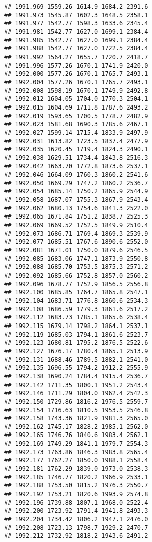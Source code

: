\documentclass[
]{article}
\begin{document}
\begin{verbatim}
## 1991.969 1559.26 1614.9 1684.2 2391.6
## 1991.973 1545.87 1602.3 1648.5 2358.1
## 1991.977 1542.77 1598.3 1633.6 2345.4
## 1991.981 1542.77 1627.0 1699.1 2384.4
## 1991.985 1542.77 1627.0 1699.1 2384.4
## 1991.988 1542.77 1627.0 1722.5 2384.4
## 1991.992 1564.27 1655.7 1720.7 2418.7
## 1991.996 1577.26 1670.1 1741.9 2420.0
## 1992.000 1577.26 1670.1 1765.7 2493.1
## 1992.004 1577.26 1670.1 1765.7 2493.1
## 1992.008 1598.19 1670.1 1749.9 2492.8
## 1992.012 1604.05 1704.0 1770.3 2504.1
## 1992.015 1604.69 1711.8 1787.6 2493.2
## 1992.019 1593.65 1700.5 1778.7 2482.9
## 1992.023 1581.68 1690.3 1785.6 2467.1
## 1992.027 1599.14 1715.4 1833.9 2497.9
## 1992.031 1613.82 1723.5 1837.4 2477.9
## 1992.035 1620.45 1719.4 1824.3 2490.1
## 1992.038 1629.51 1734.4 1843.8 2516.3
## 1992.042 1663.70 1772.8 1873.6 2537.1
## 1992.046 1664.09 1760.3 1860.2 2541.6
## 1992.050 1669.29 1747.2 1860.2 2536.7
## 1992.054 1685.14 1750.2 1865.9 2544.9
## 1992.058 1687.07 1755.3 1867.9 2543.4
## 1992.062 1680.13 1754.6 1841.3 2522.0
## 1992.065 1671.84 1751.2 1838.7 2525.3
## 1992.069 1669.52 1752.5 1849.9 2510.4
## 1992.073 1686.71 1769.4 1869.3 2539.9
## 1992.077 1685.51 1767.6 1890.6 2552.0
## 1992.081 1671.01 1750.0 1879.6 2546.5
## 1992.085 1683.06 1747.1 1873.9 2550.8
## 1992.088 1685.70 1753.5 1875.3 2571.2
## 1992.092 1685.66 1752.8 1857.0 2560.2
## 1992.096 1678.77 1752.9 1856.5 2556.8
## 1992.100 1685.85 1764.7 1865.8 2547.1
## 1992.104 1683.71 1776.8 1860.6 2534.3
## 1992.108 1686.59 1779.3 1861.6 2517.2
## 1992.112 1683.73 1785.1 1865.6 2538.4
## 1992.115 1679.14 1798.2 1864.1 2537.1
## 1992.119 1685.03 1794.1 1861.6 2523.7
## 1992.123 1680.81 1795.2 1876.5 2522.6
## 1992.127 1676.17 1780.4 1865.1 2513.9
## 1992.131 1688.46 1789.5 1882.1 2541.0
## 1992.135 1696.55 1794.2 1912.2 2555.9
## 1992.138 1690.24 1784.4 1915.4 2536.7
## 1992.142 1711.35 1800.1 1951.2 2543.4
## 1992.146 1711.29 1804.0 1962.4 2542.3
## 1992.150 1729.86 1816.2 1976.5 2559.7
## 1992.154 1716.63 1810.5 1953.5 2546.8
## 1992.158 1743.36 1821.9 1981.3 2565.0
## 1992.162 1745.17 1828.2 1985.1 2562.0
## 1992.165 1746.76 1840.6 1983.4 2562.1
## 1992.169 1749.29 1841.1 1979.7 2554.3
## 1992.173 1763.86 1846.3 1983.8 2565.4
## 1992.177 1762.27 1850.0 1988.1 2558.4
## 1992.181 1762.29 1839.0 1973.0 2538.3
## 1992.185 1746.77 1820.2 1966.9 2533.1
## 1992.188 1753.50 1815.2 1976.3 2550.7
## 1992.192 1753.21 1820.6 1993.9 2574.8
## 1992.196 1739.88 1807.1 1968.0 2522.4
## 1992.200 1723.92 1791.4 1941.8 2493.3
## 1992.204 1734.42 1806.2 1947.1 2476.0
## 1992.208 1723.13 1798.7 1929.2 2470.7
## 1992.212 1732.92 1818.2 1943.6 2491.2

\end{verbatim}
\end{document}
